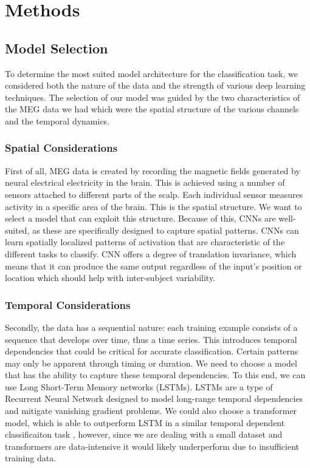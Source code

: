 \documentclass[conference]{IEEEtran}
\begin{document}
\section{Methods}

\subsection{Model Selection}
To determine the most suited model architecture for the classification task, we considered both the nature of the data and the strength of various deep learning techniques.
 The selection of our model was guided by the two characteristics of the MEG data we had which were the spatial structure of the various channels and the temporal dynamics.

\subsubsection{Spatial Considerations}
First of all, MEG data is created by recording the magnetic fields generated by neural electrical electricity in the brain.
 This is achieved using a number of sensors attached to different parts of the scalp. Each individual sensor measures activity 
 in a specific area of the brain. This is the spatial structure. We want to select a model that can exploit this structure.
  Because of this, CNNs are well-suited, as these are specifically designed to capture spatial patterns.
CNNs can learn spatially localized patterns of activation that are characteristic of the different tasks to classify. 
CNN offers a degree of translation invariance, which means that it can produce the same output regardless of the input's position or location which should help with inter-subject variability. 

\subsubsection{Temporal Considerations}
Secondly, the data has a sequential nature: each training example consists of a sequence that develops over time, thus a time series. This introduces temporal dependencies that could be critical for accurate classification. Certain patterns may only be apparent through timing or duration. We need to choose a model that has the ability to capture these temporal dependencies. To this end, we can use Long Short-Term Memory networks (LSTMs). LSTMs are a type of Recurrent Neural Network designed to model long-range temporal dependencies and mitigate vanishing gradient problems. We could also choose a transformer model, which is able to outperform LSTM in a similar temporal dependent classificaiton task \cite{ali2024comprehensive}, however, since we are dealing with a small dataset and transformers are data-intensive it would likely underperform due to insufficient training data. 
\end{document}
